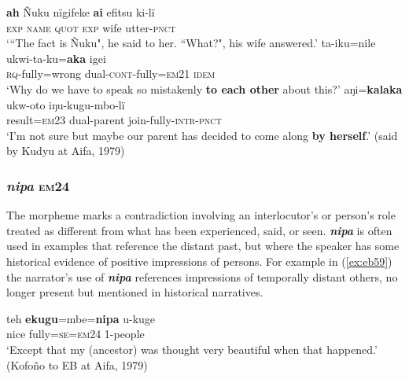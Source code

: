 \documentclass[output=paper]{langsci/langscibook}
\begin{document}
\begin{exe}
\ex \label{ex:eb58}
	\begin{xlist}
	\ex \label{ex:eb58a}
	\gll \textbf{ah} Ñuku nïgifeke \textbf{ai} efitsu ki-lï\\
	\textsc{exp} \textsc{name} \textsc{quot} \textsc{exp} wife utter-\textsc{pnct}\\
	\trans `“The fact is Ñuku", he said to her. “What?", his wife answered.’
	\ex \label{ex:eb58b}
	\gll ta-iku=nile ukwi-ta-ku=\textbf{aka} igei\\
	\textsc{rq}-fully=wrong dual-\textsc{cont}-fully=\textsc{em21} \textsc{idem}\\
	\trans ‘Why do we have to speak so mistakenly \textbf{to each other} about this?'
	\ex \label{ex:eb58c}
	\gll aŋi=\textbf{kalaka} ukw-oto iŋu-kugu-mbo-lï\\
	result=\textsc{em23} dual-parent join-fully-\textsc{intr-pnct}\\
	\trans ‘I’m not sure but maybe our parent has decided to come along \textbf{by herself}.’ (said by Kudyu at Aifa, 1979)
\end{xlist}
\end{exe}

\subsubsection{\textit{nipa} \textsc{em}24}

The morpheme marks a contradiction  involving an interlocutor’s or  person’s role treated as different from what has been experienced, said, or seen. \textbf{\textit{nipa}}  is often used in examples that reference the distant past,  but where the speaker has some historical evidence of positive impressions of  persons.  For example in (\ref{ex:eb59}) the narrator’s  use of \textbf{\textit{nipa}} references impressions of temporally distant others, no longer present but mentioned in historical narratives. 

\begin{exe}
	\ex \label{ex:eb59}
	\gll teh \textbf{ekugu}=mbe=\textbf{nipa} u-kuge\\
	nice fully=\textsc{se=em24} 1-people\\
	\trans ‘Except that my (ancestor) was  thought very beautiful when that happened.' (Kofoño to EB at Aifa, 1979)
\end{exe}
\end{document}
